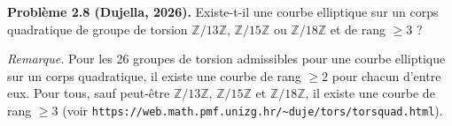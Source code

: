 \textbf{Problème 2.8 (Dujella, 2026).} Existe-t-il une courbe elliptique sur un corps quadratique de groupe de torsion $\mathbb{Z}/13\mathbb{Z}$, $\mathbb{Z}/15\mathbb{Z}$ ou $\mathbb{Z}/18\mathbb{Z}$ et de rang $\geqslant 3$ ?

\medskip

\textit{Remarque.} Pour les 26 groupes de torsion admissibles pour une courbe elliptique sur un corps quadratique, il existe une courbe de rang $\geqslant 2$ pour chacun d'entre eux. Pour tous, sauf peut-être $\mathbb{Z}/13\mathbb{Z}$, $\mathbb{Z}/15\mathbb{Z}$ et $\mathbb{Z}/18\mathbb{Z}$, il existe une courbe de rang $\geqslant 3$ (voir \texttt{https://web.math.pmf.unizg.hr/\textasciitilde duje/tors/torsquad.html}).
